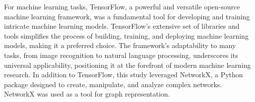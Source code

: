 For machine learning tasks, TensorFlow, a powerful and versatile open-source machine learning framework, was a fundamental tool for developing and training intricate machine learning models.
TensorFlow's extensive set of libraries and tools simplifies the process of building, training, and deploying machine learning models, making it a preferred choice.
The framework's adaptability to many tasks, from image recognition to natural language processing, underscores its universal applicability, positioning it at the forefront of modern machine learning research.
In addition to TensorFlow, this study leveraged NetworkX, a Python package designed to create, manipulate, and analyze complex networks. NetworkX was used as a tool for graph representation.
